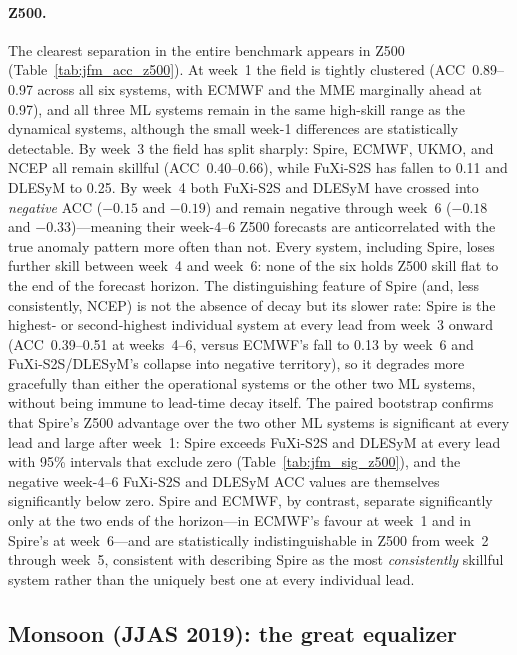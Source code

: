 \documentclass[11pt,a4paper]{article}
\begin{document}
\paragraph{Z500.}
The clearest separation in the entire benchmark appears in Z500
(Table~\ref{tab:jfm_acc_z500}). At week~1 the field is tightly clustered
(ACC~0.89--0.97 across all six systems, with ECMWF and the MME marginally
ahead at 0.97), and all three ML systems remain in the same high-skill range as
the dynamical systems, although the small week-1 differences are statistically
detectable. By week~3 the field has split sharply: Spire, ECMWF, UKMO, and NCEP
all remain skillful (ACC~0.40--0.66), while FuXi-S2S has
fallen to 0.11 and DLESyM to 0.25. By week~4 both FuXi-S2S and DLESyM have
crossed into \emph{negative} ACC ($-0.15$ and $-0.19$) and remain negative
through week~6 ($-0.18$ and $-0.33$)---meaning their week-4--6 Z500 forecasts
are anticorrelated with the true anomaly pattern more often than not.
Every system, including Spire, loses further skill between week~4 and week~6:
none of the six holds Z500 skill flat to the end of the forecast horizon. The
distinguishing feature of Spire (and, less consistently, NCEP) is not the
absence of decay but its slower rate: Spire is the highest- or second-highest
individual system at every lead from week~3 onward (ACC~0.39--0.51 at
weeks~4--6, versus ECMWF's fall to 0.13 by week~6 and FuXi-S2S/DLESyM's
collapse into negative territory), so it degrades more gracefully than either
the operational systems or the other two ML systems, without being immune to
lead-time decay itself. The paired bootstrap confirms that Spire's Z500
advantage over the two other ML systems is significant at every lead and large
after week~1: Spire
exceeds FuXi-S2S and DLESyM at every lead with 95\% intervals
that exclude zero (Table~\ref{tab:jfm_sig_z500}), and the negative week-4--6
FuXi-S2S and DLESyM ACC values are themselves significantly below zero. Spire
and ECMWF, by contrast, separate significantly only at the two ends of the
horizon---in ECMWF's favour at week~1 and in Spire's at week~6---and are
statistically indistinguishable in Z500 from week~2 through week~5, consistent
with describing Spire as the most \emph{consistently} skillful system rather
than the uniquely best one at every individual lead.







\subsection{Monsoon (JJAS 2019): the great equalizer}\label{sec:jjas}
\end{document}
